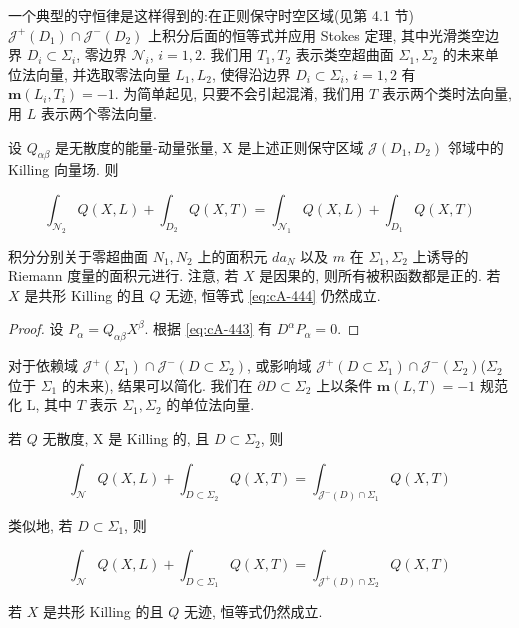 一个典型的守恒律是这样得到的:在正则保守时空区域(见第 4.1 节)$\mathcal{J}^{+}(D_{1})\cap\mathcal{J}^{-}(D_{2})$ 上积分后面的恒等式并应用 Stokes 定理, 其中光滑类空边界 $D_{i}\subset\Sigma_{i}$, 零边界 $\mathcal{N}_i$, $i = 1, 2$. 我们用 $T_{1}, T_{2}$ 表示类空超曲面 $\Sigma_1, \Sigma_2$ 的未来单位法向量, 并选取零法向量 $L_{1}, L_{2}$, 使得沿边界 $D_{i}\subset\Sigma_{i}$, $i = 1, 2$ 有 $\mathbf{m}(L_i, T_i) = -1$. 为简单起见, 只要不会引起混淆, 我们用 $T$ 表示两个类时法向量, 用 $L$ 表示两个零法向量.

\begin{proposition}\label{prop:cA-4.6}
设 $Q_{\alpha\beta}$ 是无散度的能量-动量张量, X 是上述正则保守区域 $\mathcal{J}(D_{1}, D_{2})$ 邻域中的 Killing 向量场. 则

\begin{equation}
\int_{\mathcal{N}_{2}}Q(X, L) + \int_{D_{2}}Q(X, T) = \int_{\mathcal{N}_{1}}Q(X, L) + \int_{D_{1}}Q(X, T)\label{eq:cA-444}
\end{equation}
\end{proposition}

积分分别关于零超曲面 $N_{1}, N_{2}$ 上的面积元 $da_{N}$ 以及 $m$ 在 $\Sigma_{1}, \Sigma_{2}$ 上诱导的 Riemann 度量的面积元进行. 注意, 若 $X$ 是因果的, 则所有被积函数都是正的. 若 $X$ 是共形 Killing 的且 $Q$ 无迹, 恒等式 \eqref{eq:cA-444} 仍然成立.

\begin{proof}
设 $P_{\alpha} = Q_{\alpha\beta}X^{\beta}$. 根据 \eqref{eq:cA-443} 有 $D^{\alpha}P_{\alpha} = 0$.
\end{proof}

对于依赖域 $\mathcal{J}^{+}(\Sigma_{1})\cap\mathcal{J}^{-}(D\subset\Sigma_{2})$, 或影响域 $\mathcal{J}^{+}(D\subset\Sigma_{1})\cap\mathcal{J}^{-}(\Sigma_{2})$($\Sigma_{2}$ 位于 $\Sigma_{1}$ 的未来), 结果可以简化. 我们在 $\partial D\subset\Sigma_{2}$ 上以条件 $\mathbf{m}(L, T) = -1$ 规范化 L, 其中 $T$ 表示 $\Sigma_{1}, \Sigma_{2}$ 的单位法向量.

\begin{corollary}\label{cor:cA-4.7}
若 $Q$ 无散度, X 是 Killing 的, 且 $D \subset \Sigma_2$, 则

\begin{equation}
\int_{\mathcal{N}}Q(X, L) + \int_{D \subset \Sigma_{2}}Q(X, T) = \int_{\mathcal{J}^{-}(D)\cap\Sigma_{1}}Q(X, T)\label{eq:cA-445}
\end{equation}

类似地, 若 $D\subset\Sigma_{1}$, 则

\begin{equation}
\int_{\mathcal{N}}Q(X, L) + \int_{D \subset \Sigma_{1}}Q(X, T) = \int_{\mathcal{J}^{+}(D)\cap\Sigma_{2}}Q(X, T)\label{eq:cA-446}
\end{equation}

若 $X$ 是共形 Killing 的且 $Q$ 无迹, 恒等式仍然成立.
\end{corollary}

